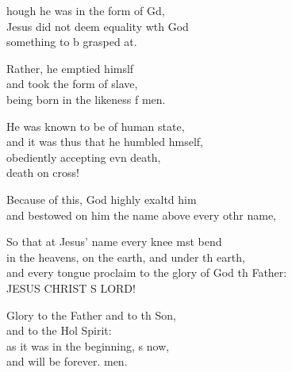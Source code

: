 \begin{psalmverse}
  \begin{patverse}
    hough he was in the form of Gd,\Flex\\
    Jesus did not deem equality w\pointup{\i}th God\Med\\
    something to b grasped at.
    
    Rather, he emptied himslf\Flex\\
    and took the form of  slave,\Med\\
    being born in the likeness f men.
    
    He was known to be of human state,\Med\\
    and it was thus that he humbled h\pointup{\i}mself,\\
    obediently accepting evn death,\Med\\
    death on  cross!
    
    Because of this, God highly exaltd him\Med\\
    and bestowed on him the name above every othr name,
    
    So that at Jesus’ name every knee mst bend\Med\\
    in the heavens, on the earth, and under th earth,\\
    and every tongue proclaim to the glory of God th Father:\Med\\
    JESUS CHRIST S LORD!

    Glory to the Father and to th Son,\Med\\
    and to the Hol Spirit:\\
    as it was in the beginning, \pointup{\i}s now,\Med\\
    and will be forever. men.
  \end{patverse}
\end{psalmverse}
